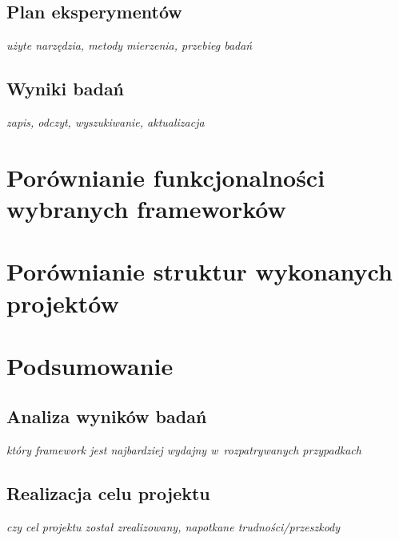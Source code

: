 \documentclass[printmode]{mgr}
\begin{document}
\section{Plan eksperymentów}
\emph{użyte narzędzia, metody mierzenia, przebieg badań}

\section{Wyniki badań}
\emph{zapis, odczyt, wyszukiwanie, aktualizacja}

\chapter{Porównianie funkcjonalności wybranych frameworków}

\chapter{Porównianie struktur wykonanych projektów}

\chapter{Podsumowanie}
\section{Analiza wyników badań}
\emph{który framework jest najbardziej wydajny w~rozpatrywanych przypadkach}

\section{Realizacja celu projektu}
\emph{czy cel projektu został zrealizowany, napotkane trudności/przeszkody}
\end{document}
